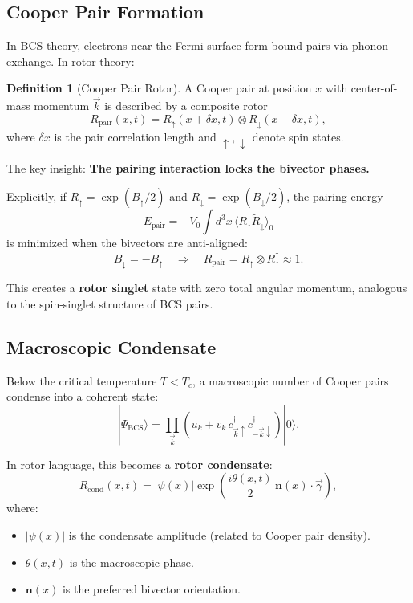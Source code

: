 \documentclass[12pt,a4paper]{article}
\theoremstyle{definition}
\newtheorem{definition}{Definition}[section]
\theoremstyle{remark}
\begin{document}
\subsection{Cooper Pair Formation}

In BCS theory, electrons near the Fermi surface form bound pairs via phonon exchange. In rotor theory:

\begin{definition}[Cooper Pair Rotor]
A Cooper pair at position $x$ with center-of-mass momentum $\vec{k}$ is described by a composite rotor
\begin{equation}
R_{\text{pair}}(x,t) = R_{\uparrow}(x + \delta x, t) \otimes R_{\downarrow}(x - \delta x, t),
\end{equation}
where $\delta x$ is the pair correlation length and $\uparrow, \downarrow$ denote spin states.
\end{definition}

The key insight: \textbf{The pairing interaction locks the bivector phases.}

Explicitly, if $R_\uparrow = \exp(B_\uparrow / 2)$ and $R_\downarrow = \exp(B_\downarrow / 2)$, the pairing energy
\begin{equation}
E_{\text{pair}} = -V_0 \int d^3x \, \langle R_\uparrow \tilde{R}_\downarrow \rangle_0
\end{equation}
is minimized when the bivectors are anti-aligned:
\begin{equation}
B_\downarrow = -B_\uparrow \quad \Rightarrow \quad R_{\text{pair}} = R_\uparrow \otimes R_\uparrow^\dagger \approx 1.
\end{equation}

This creates a \textbf{rotor singlet} state with zero total angular momentum, analogous to the spin-singlet structure of BCS pairs.

\subsection{Macroscopic Condensate}

Below the critical temperature $T < T_c$, a macroscopic number of Cooper pairs condense into a coherent state:
\begin{equation}
|\Psi_{\text{BCS}} \rangle = \prod_{\vec{k}} \left( u_k + v_k \, c_{\vec{k}\uparrow}^\dagger c_{-\vec{k}\downarrow}^\dagger \right) |0\rangle.
\end{equation}

In rotor language, this becomes a \textbf{rotor condensate}:
\begin{equation}
R_{\text{cond}}(x,t) = |\psi(x)| \exp\left(\frac{i\theta(x,t)}{2} \, \mathbf{n}(x) \cdot \vec{\gamma}\right),
\end{equation}
where:
\begin{itemize}
\item $|\psi(x)|$ is the condensate amplitude (related to Cooper pair density).
\item $\theta(x,t)$ is the macroscopic phase.
\item $\mathbf{n}(x)$ is the preferred bivector orientation.
\end{itemize}
\end{document}
